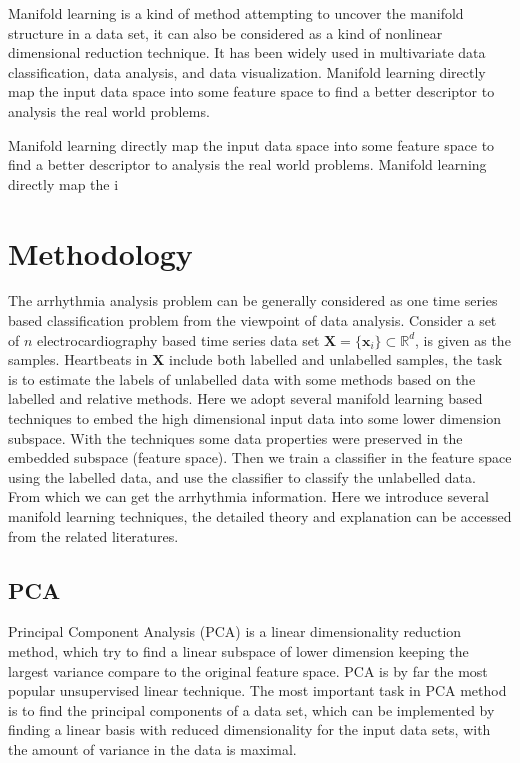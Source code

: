 \documentclass[journal]{IEEEtran}
\begin{document}
Manifold learning is a kind of method attempting to uncover the manifold structure in a data set, it can also be considered as a kind of nonlinear dimensional reduction technique.
It has been widely used in multivariate data classification, data analysis, and data visualization.
Manifold learning directly map the input data space into some feature space to find a better descriptor to analysis the real world problems. 

Manifold learning directly map the input data space into some feature space to find a better descriptor to analysis the real world problems. 
Manifold learning directly map the i

%
%

\section{Methodology}
The arrhythmia analysis problem can be generally considered as one time series based classification problem from the viewpoint of data analysis.
Consider a set of $n$ electrocardiography based time series data set $\boldsymbol{X} = \{\boldsymbol{x}_i\} \subset \mathbb{R}^d$, is given as the samples.
Heartbeats in $\boldsymbol{X}$ include both labelled and unlabelled samples, the task is to estimate the labels of unlabelled data with some methods based on the labelled and relative methods.
Here we adopt several manifold learning based techniques to embed the high dimensional input data into some lower dimension subspace. 
With the techniques some data properties were preserved in the embedded subspace (feature space).
Then we train a classifier in the feature space using the labelled data, and use the classifier to classify the unlabelled data. From which we can get the arrhythmia information. 
Here we introduce several manifold learning techniques, the detailed theory and explanation can be accessed from the related literatures.


%
%

\subsection{PCA}
Principal Component Analysis (PCA) is a linear dimensionality reduction method, which try to find a linear subspace of lower dimension keeping the largest variance compare to the original feature space.
PCA is by far the most popular unsupervised linear technique.
The most important task in PCA method is to find the principal components of a data set, which can be implemented by finding a linear basis with reduced dimensionality for the input data sets, with the amount of variance in the data is maximal.
\end{document}
